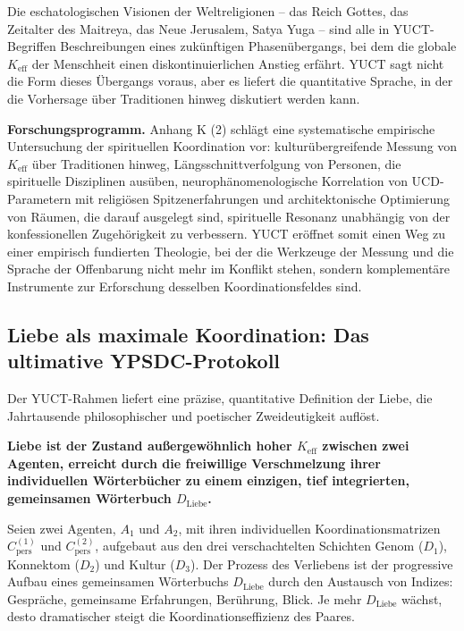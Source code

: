 \documentclass[12pt,a4paper]{article}
\begin{document}
	Die eschatologischen Visionen der Weltreligionen – das Reich Gottes, das Zeitalter des Maitreya, das Neue Jerusalem, Satya Yuga – sind alle in YUCT-Begriffen Beschreibungen eines zukünftigen Phasenübergangs, bei dem die globale \(K_{\mathrm{eff}}\) der Menschheit einen diskontinuierlichen Anstieg erfährt. YUCT sagt nicht die Form dieses Übergangs voraus, aber es liefert die quantitative Sprache, in der die Vorhersage über Traditionen hinweg diskutiert werden kann.
	
	\textbf{Forschungsprogramm.} Anhang K (2) schlägt eine systematische empirische Untersuchung der spirituellen Koordination vor: kulturübergreifende Messung von \(K_{\mathrm{eff}}\) über Traditionen hinweg, Längsschnittverfolgung von Personen, die spirituelle Disziplinen ausüben, neurophänomenologische Korrelation von UCD-Parametern mit religiösen Spitzenerfahrungen und architektonische Optimierung von Räumen, die darauf ausgelegt sind, spirituelle Resonanz unabhängig von der konfessionellen Zugehörigkeit zu verbessern. YUCT eröffnet somit einen Weg zu einer empirisch fundierten Theologie, bei der die Werkzeuge der Messung und die Sprache der Offenbarung nicht mehr im Konflikt stehen, sondern komplementäre Instrumente zur Erforschung desselben Koordinationsfeldes sind.
	
	\subsection{Liebe als maximale Koordination: Das ultimative YPSDC-Protokoll}
	
	Der YUCT-Rahmen liefert eine präzise, quantitative Definition der Liebe, die Jahrtausende philosophischer und poetischer Zweideutigkeit auflöst.
	
	\textbf{Liebe ist der Zustand außergewöhnlich hoher \(K_{\mathrm{eff}}\) zwischen zwei Agenten, erreicht durch die freiwillige Verschmelzung ihrer individuellen Wörterbücher zu einem einzigen, tief integrierten, gemeinsamen Wörterbuch \(D_{\text{Liebe}}\).}
	
	Seien zwei Agenten, \(A_1\) und \(A_2\), mit ihren individuellen Koordinationsmatrizen \(C_{\text{pers}}^{(1)}\) und \(C_{\text{pers}}^{(2)}\), aufgebaut aus den drei verschachtelten Schichten Genom (\(D_1\)), Konnektom (\(D_2\)) und Kultur (\(D_3\)). Der Prozess des Verliebens ist der progressive Aufbau eines gemeinsamen Wörterbuchs \(D_{\text{Liebe}}\) durch den Austausch von Indizes: Gespräche, gemeinsame Erfahrungen, Berührung, Blick. Je mehr \(D_{\text{Liebe}}\) wächst, desto dramatischer steigt die Koordinationseffizienz des Paares.
	
\end{document}
